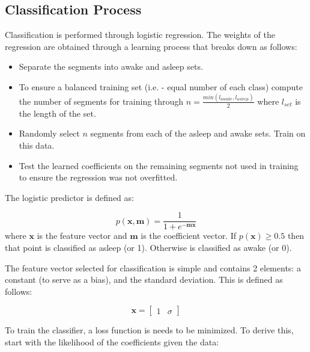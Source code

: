             \subsection{Classification Process}

                Classification is performed through logistic regression. The weights of the regression are obtained through a learning process that breaks down as follows:

                \begin{itemize}
                    \item Separate the segments into awake and asleep sets.
                    \item To ensure a balanced training set (i.e. - equal number of each class) compute the number of segments for training through $n = \frac{min(l_{awake},l_{asleep})}{2}$ where $l_{set}$ is the length of the set.
                    \item Randomly select $n$ segments from each of the asleep and awake sets. Train on this data.
                    \item Test the learned coefficients on the remaining segments not used in training to ensure the regression was not overfitted.
                \end{itemize}

                The logistic predictor is defined as:

                \begin{equation}
                    p(\mathbf{x}, \mathbf{m}) = \frac{1}{1 + e^{-\mathbf{mx}}}
                \end{equation}
                where $\mathbf{x}$ is the feature vector and $\mathbf{m}$ is the coefficient vector. If $p(\mathbf{x}) \geq 0.5$ then that point is classified as asleep (or 1). Otherwise is classified as awake (or 0).

                The feature vector selected for classification is simple and contains 2 elements: a constant (to serve as a bias), and the standard deviation. This is defined as follows: 

                \begin{equation}
                    \mathbf{x} = \begin{bmatrix} 1 & \sigma \end{bmatrix}
                \end{equation}

                To train the classifier, a loss function is needs to be minimized. To derive this, start with the likelihood of the coefficients given the data:

